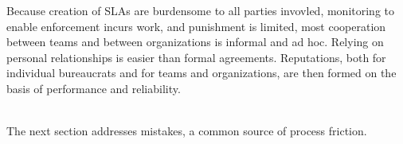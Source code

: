 Because creation of SLAs are burdensome to all parties invovled, monitoring to enable enforcement incurs work, and punishment is limited, most cooperation between teams and between organizations is informal and ad hoc. Relying on personal relationships is easier than formal agreements. Reputations, both for individual bureaucrats and for teams and organizations, are then formed on the basis of performance and reliability.

\ \\

The next section addresses mistakes, a common source of process friction. 
